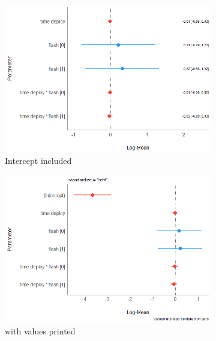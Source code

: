 \begin{figure}
		\begin{subfigure}{.4\textwidth}
		  \centering
	\includegraphics[scale=.4]{../R/glmm_sp_files/figure-gfm/parameters-1.png}
\caption{Intercept included}
		\label{fig:para_raa1}
	\end{subfigure}
		\begin{subfigure}{.4\textwidth}
		  \centering
	\includegraphics[scale=.4]{../R/glmm_sp_files/figure-gfm/parameters-2.png}
\caption{with values printed}
		\label{fig:para_raa2}
	\end{subfigure}
		\begin{subfigure}{.8\textwidth}
		  \centering

\end{subfigure}
\end{figure}

